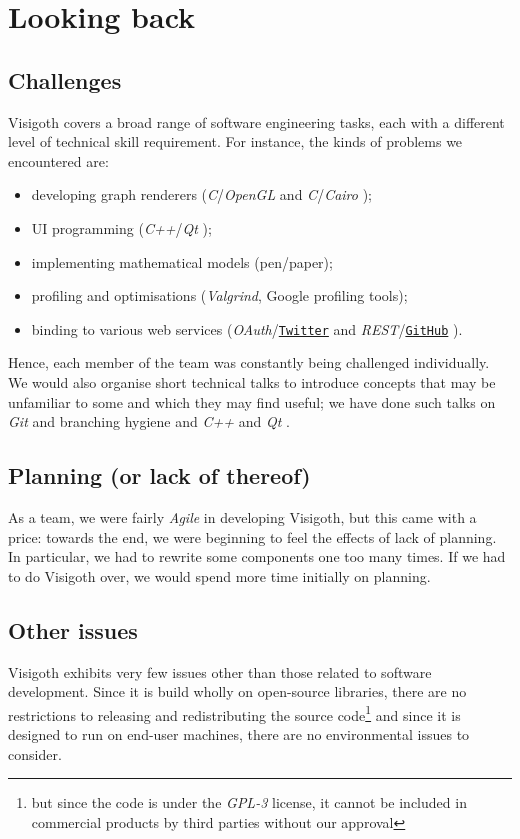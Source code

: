 \documentclass[a4paper,11pt,titlepage]{article}
\let\stdhref\href
\renewcommand{\href}[2]{\stdhref{#1}{\texttt{#2}}}
\let\stdsection\section         %
\renewcommand{\section}{\newpage\stdsection}
\newcommand{\buzz}[1]{\emph{#1}}
\newcommand{\Qt}{\buzz{Qt} }
\newcommand{\OpenGL}{\buzz{OpenGL} }
\newcommand{\Git}{\buzz{Git} }
\newcommand{\Cairo}{\buzz{Cairo} }
\newcommand{\Twitter}{\href{http://twitter.com}{Twitter} }
\newcommand{\GitHub}{\href{https://github.com}{GitHub} }
\begin{document}
\section{Looking back}

\subsection{Challenges}
Visigoth covers a broad range of software engineering tasks, each with
a different level of technical skill requirement. For instance, the
kinds of problems we encountered are:
\begin{itemize}
\item developing graph renderers (\buzz{C}/\OpenGL and
  \buzz{C}/\Cairo);
\item UI programming (\buzz{C++}/\Qt);
\item implementing mathematical models (pen/paper);
\item profiling and optimisations (\buzz{Valgrind}, Google profiling
  tools);
\item binding to various web services (\buzz{OAuth}/\Twitter and
  \buzz{REST}/\GitHub).
\end{itemize}

Hence, each member of the team was constantly being challenged
individually. We would also organise short technical talks to
introduce concepts that may be unfamiliar to some and which they may
find useful; we have done such talks on \Git and branching hygiene and
\buzz{C++} and \Qt.

\subsection{Planning (or lack of thereof)}

As a team, we were fairly \buzz{Agile} in developing Visigoth, but
this came with a price: towards the end, we were beginning to feel the
effects of lack of planning. In particular, we had to rewrite some
components one too many times. If we had to do Visigoth over, we would
spend more time initially on planning.

\subsection{Other issues}

Visigoth exhibits very few issues other than those related to software
development. Since it is build wholly on open-source libraries, there
are no restrictions to releasing and redistributing the source
code\footnote{but since the code is under the \buzz{GPL-3} license,
  it cannot be included in commercial products by third parties
  without our approval} and since it is designed to run on end-user
machines, there are no environmental issues to consider.
\end{document}

